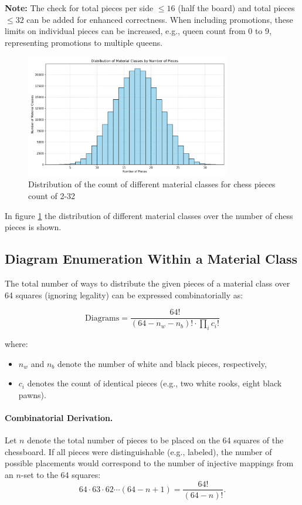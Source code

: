 \documentclass[12pt]{article}
\begin{document}
\noindent
\textbf{Note:} The check for total pieces per side $\leq 16$ (half the board) and total
pieces $\leq 32$ can be added for enhanced correctness. When including promotions, 
these limits on individual pieces can be increased, e.g., queen count
from 0 to 9, representing promotions to multiple queens.

\begin{figure}[h!]
  \centering
  \includegraphics[width=0.8\textwidth]{material_class_histogram.png}
  \caption{Distribution of the count of different material classes for chess pieces count of 2-32}
  \label{fig:material_class_hist}
\end{figure}
In figure \ref{fig:material_class_hist} the distribution of different material classes over the number of chess pieces is shown.
\subsection{Diagram Enumeration Within a Material Class}

The total number of ways to distribute the given pieces of a material class over 64 squares (ignoring legality) can be expressed combinatorially as:

\[
\text{Diagrams} = \frac{64!}{(64 - n_w - n_b)! \cdot \prod_i c_i!}
\]

where:
\begin{itemize}
\item $n_w$ and $n_b$ denote the number of white and black pieces, respectively,
\item $c_i$ denotes the count of identical pieces (e.g., two white rooks, eight black pawns).
\end{itemize}

\paragraph{Combinatorial Derivation.}
Let \(n\) denote the total number of pieces to be placed on the 64 squares of the chessboard.  
If all pieces were distinguishable (e.g., labeled), the number of possible placements would correspond to the number of injective mappings from an \(n\)-set to the 64 squares:
\[
64 \cdot 63 \cdot 62 \cdots (64 - n + 1) = \frac{64!}{(64 - n)!}.
\]
\end{document}
